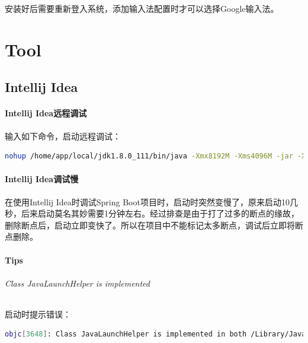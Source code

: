 \documentclass[letter]{book}
\begin{document}
安装好后需要重新登入系统，添加输入法配置时才可以选择Google输入法。

\part{Tool}

\newpage

\chapter{Intellij Idea}

\subsection{Intellij Idea远程调试}

输入如下命令，启动远程调试：

\begin{lstlisting}[language=Bash]
nohup /home/app/local/jdk1.8.0_111/bin/java -Xmx8192M -Xms4096M -jar -Xdebug -Xrunjdwp:transport=dt_socket,suspend=n,server=y,address=5005 /home/app/backend/credit-system-web-boot-1.1.9.jar --spring.config.location=application.properties>/dev/null &
\end{lstlisting}


\subsection{Intellij Idea调试慢}

在使用Intellij Idea时调试Spring Boot项目时，启动时突然变慢了，原来启动10几秒，后来启动莫名其妙需要1分钟左右。经过排查是由于打了过多的断点的缘故，删除断点后，启动立即变快了。所以在项目中不能标记太多断点，调试后立即将断点删除。

\subsection{Tips}


\paragraph{Class JavaLaunchHelper is implemented}


启动时提示错误：

\begin{lstlisting}[language=Bash]
objc[3648]: Class JavaLaunchHelper is implemented in both /Library/Java/JavaVirtualMachines/jdk1.8.0_121.jdk/Contents/Home/bin/java (0x10d19c4c0) and /Library/Java/JavaVirtualMachines/jdk1.8.0_121.jdk/Contents/Home/jre/lib/libinstrument.dylib (0x10ea194e0). One of the two will be used. Which one is undefined.
\end{lstlisting}
\end{document}
